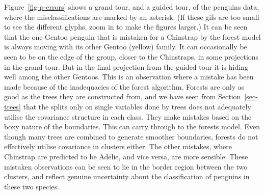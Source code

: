 \documentclass[
  letterpaper,
]{book}
\newenvironment{Shaded}{\begin{snugshade}}{\end{snugshade}}
\newcommand{\AttributeTok}[1]{\textcolor[rgb]{0.40,0.45,0.13}{#1}}
\newcommand{\ConstantTok}[1]{\textcolor[rgb]{0.56,0.35,0.01}{#1}}
\newcommand{\DecValTok}[1]{\textcolor[rgb]{0.68,0.00,0.00}{#1}}
\newcommand{\FunctionTok}[1]{\textcolor[rgb]{0.28,0.35,0.67}{#1}}
\newcommand{\NormalTok}[1]{\textcolor[rgb]{0.00,0.23,0.31}{#1}}
\newcommand{\SpecialCharTok}[1]{\textcolor[rgb]{0.37,0.37,0.37}{#1}}
\newcommand{\StringTok}[1]{\textcolor[rgb]{0.13,0.47,0.30}{#1}}
\begin{document}
\begin{Shaded}
\end{Shaded}

Figure~\ref{fig-p-errors} shows a grand tour, and a guided tour, of the
penguins data, where the misclassifications are marked by an asterisk.
(If these gifs are too small to see the different glyphs, zoom in to
make the figures larger.) It can be seen that the one Gentoo penguin
that is mistaken for a Chinstrap by the forest model is always moving
with its other Gentoo (yellow) family. It can occasionally be seen to be
on the edge of the group, closer to the Chinstraps, in some projections
in the grand tour. But in the final projection from the guided tour it
is hiding well among the other Gentoos. This is an observation where a
mistake has been made because of the inadequacies of the forest
algorithm. Forests are only as good as the trees they are constructed
from, and we have seen from Section~\ref{sec-trees} that the splits only
on single variables done by trees does not adequately utilise the
covariance structure in each class. They make mistakes based on the boxy
nature of the boundaries. This can carry through to the forests model.
Even though many trees are combined to generate smoother boundaries,
forests do not effectively utilise covariance in clusters either. The
other mistakes, where Chinstrap are predicted to be Adelie, and vice
versa, are more sensible. These mistaken observations can be seen to lie
in the border region between the two clusters, and reflect genuine
uncertainty about the classification of penguins in these two species.
\end{document}
